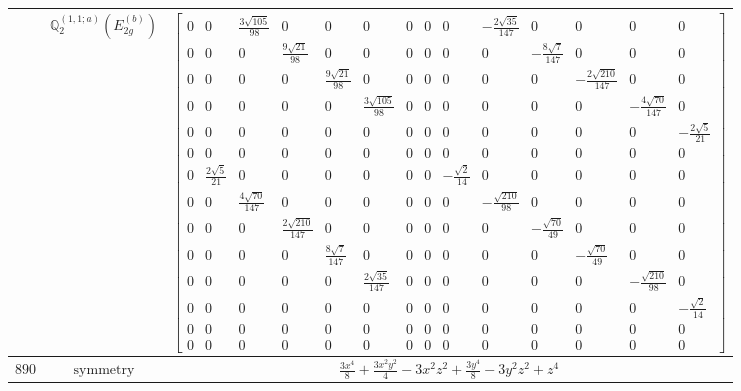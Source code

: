 \documentclass[fleqn,8pt,landscape]{jsarticle}
\begin{document}
\begin{longtable}{ccc}
$  $ & $ \mathbb{Q}_{2}^{(1,1;a)}(E_{2g}^{(b)}) $ & $ \begin{bmatrix} 0 & 0 & \frac{3 \sqrt{105}}{98} & 0 & 0 & 0 & 0 & 0 & 0 & - \frac{2 \sqrt{35}}{147} & 0 & 0 & 0 & 0 \\ 0 & 0 & 0 & \frac{9 \sqrt{21}}{98} & 0 & 0 & 0 & 0 & 0 & 0 & - \frac{8 \sqrt{7}}{147} & 0 & 0 & 0 \\ 0 & 0 & 0 & 0 & \frac{9 \sqrt{21}}{98} & 0 & 0 & 0 & 0 & 0 & 0 & - \frac{2 \sqrt{210}}{147} & 0 & 0 \\ 0 & 0 & 0 & 0 & 0 & \frac{3 \sqrt{105}}{98} & 0 & 0 & 0 & 0 & 0 & 0 & - \frac{4 \sqrt{70}}{147} & 0 \\ 0 & 0 & 0 & 0 & 0 & 0 & 0 & 0 & 0 & 0 & 0 & 0 & 0 & - \frac{2 \sqrt{5}}{21} \\ 0 & 0 & 0 & 0 & 0 & 0 & 0 & 0 & 0 & 0 & 0 & 0 & 0 & 0 \\ 0 & \frac{2 \sqrt{5}}{21} & 0 & 0 & 0 & 0 & 0 & 0 & - \frac{\sqrt{2}}{14} & 0 & 0 & 0 & 0 & 0 \\ 0 & 0 & \frac{4 \sqrt{70}}{147} & 0 & 0 & 0 & 0 & 0 & 0 & - \frac{\sqrt{210}}{98} & 0 & 0 & 0 & 0 \\ 0 & 0 & 0 & \frac{2 \sqrt{210}}{147} & 0 & 0 & 0 & 0 & 0 & 0 & - \frac{\sqrt{70}}{49} & 0 & 0 & 0 \\ 0 & 0 & 0 & 0 & \frac{8 \sqrt{7}}{147} & 0 & 0 & 0 & 0 & 0 & 0 & - \frac{\sqrt{70}}{49} & 0 & 0 \\ 0 & 0 & 0 & 0 & 0 & \frac{2 \sqrt{35}}{147} & 0 & 0 & 0 & 0 & 0 & 0 & - \frac{\sqrt{210}}{98} & 0 \\ 0 & 0 & 0 & 0 & 0 & 0 & 0 & 0 & 0 & 0 & 0 & 0 & 0 & - \frac{\sqrt{2}}{14} \\ 0 & 0 & 0 & 0 & 0 & 0 & 0 & 0 & 0 & 0 & 0 & 0 & 0 & 0 \\ 0 & 0 & 0 & 0 & 0 & 0 & 0 & 0 & 0 & 0 & 0 & 0 & 0 & 0 \end{bmatrix} $ \\ \hline
$ 890 $ & $ \text{symmetry} $ & $ \frac{3 x^{4}}{8} + \frac{3 x^{2} y^{2}}{4} - 3 x^{2} z^{2} + \frac{3 y^{4}}{8} - 3 y^{2} z^{2} + z^{4} $ \\

\end{longtable}
\end{document}

